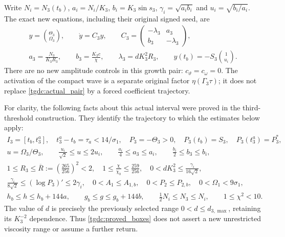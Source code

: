 Write $N_i=N_3(t_b)$, $a_i=N_i/K_3$,
$b_i=K_3\sin s_3$, $\gamma_i=\sqrt{a_i b_i}$ and
$u_i=\sqrt{b_i/a_i}$. The exact new equations, including their
original signed seed, are
\begin{equation}\label{tgdc:actual_pair}
\begin{gathered}
 y=\binom{\Theta_3}{\Omega_3},\qquad
 \dot y=C_3y,\qquad
 C_3=\begin{pmatrix}-\lambda_3&a_3\\b_3&-\lambda_3\end{pmatrix},\\
 a_3=\frac{N_3}{K_3R_3},\qquad
 b_3=\frac{K_3c}{\chi},\qquad
 \lambda_3=dK_3^2R_3,\qquad
 y(t_b)=-S_3\binom1{u_i}.
\end{gathered}
\end{equation}
There are no new amplitude controls in this growth pair:
$c_\vartheta=c_\omega=0$. The activation of the compact wave is a
separate original factor $\eta(\Gamma_3\tau)$; it does not replace
\eqref{tgdc:actual_pair} by a forced coefficient trajectory.

For clarity, the following facts about this actual interval were proved
in the third-threshold construction. They identify the trajectory to
which the estimates below apply:
\begin{equation}\label{tgdc:proved_boxes}
\begin{gathered}
 I_3=[t_b,t_3^a],\quad t_3^a-t_b=\tau_a<14/\sigma_1,\quad
 P_3=-\Theta_3>0,\quad P_3(t_b)=S_3,\quad P_3(t_3^a)=P_3^*,\\
 u=\Omega_3/\Theta_3,\qquad
 \frac{u_i}{\sqrt2}\leq u\leq2u_i,\qquad
 \frac{a_i}4\leq a_3\leq a_i,\qquad
 \frac{b_i}2\leq b_3\leq b_i,\\
 1\leq R_3\leq\overline R:=\left(\frac{265}{256}\right)^2<2,
 \quad 1\leq\frac\chi{\chi_b}\leq\frac{259}{256},\quad
 0<dK_3^2\leq\frac{\gamma_i}{16\sqrt2},\\
 \frac{\gamma_i}{8\sqrt2}\leq (\log P_3)'\leq2\gamma_i,
 \quad 0<A_1\leq A_{1,b},\quad 0<P_2\leq P_{2,b},\quad
 0<\Omega_1<9\sigma_1,\\
 h_b\leq h\leq h_b+144a,\qquad
 g_b\leq g\leq g_b+144b,\qquad
 \tfrac12N_i\leq N_3\leq N_i,\qquad 1\leq\chi^2<10.
\end{gathered}
\end{equation}
The value of $d$ is precisely the previously selected range
$0<d\leq d_{3,\max}$, retaining its $K_3^{-2}$ dependence.
Thus \eqref{tgdc:proved_boxes} does not assert a new unrestricted
viscosity range or assume a further return.

